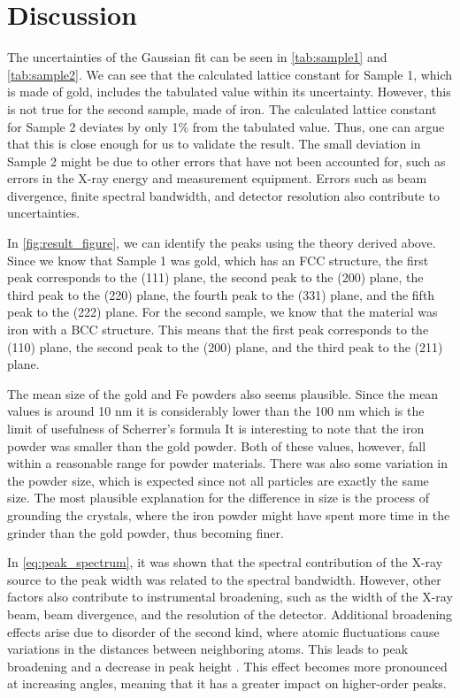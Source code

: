 \section{Discussion}
The uncertainties of the Gaussian fit can be seen in \autoref{tab:sample1} and \autoref{tab:sample2}. We can see that the calculated lattice constant for Sample 1, which is made of gold, includes the tabulated value within its uncertainty. However, this is not true for the second sample, made of iron. The calculated lattice constant for Sample 2 deviates by only 1\% from the tabulated value. Thus, one can argue that this is close enough for us to validate the result. The small deviation in Sample 2 might be due to other errors that have not been accounted for, such as errors in the X-ray energy and measurement equipment. Errors such as beam divergence, finite spectral bandwidth, and detector resolution also contribute to uncertainties.


In \autoref{fig:result_figure}, we can identify the peaks using the theory derived above. Since we know that Sample 1 was gold, which has an FCC structure, the first peak corresponds to the (111) plane, the second peak to the (200) plane, the third peak to the (220) plane, the fourth peak to the (331) plane, and the fifth peak to the (222) plane. For the second sample, we know that the material was iron with a BCC structure. This means that the first peak corresponds to the (110) plane, the second peak to the (200) plane, and the third peak to the (211) plane.

The mean size of the gold and Fe powders also seems plausible. Since the mean values is around 10 nm it is considerably lower than the 100 nm which is the limit of usefulness of Scherrer's formula It is interesting to note that the iron powder was smaller than the gold powder. Both of these values, however, fall within a reasonable range for powder materials. There was also some variation in the powder size, which is expected since not all particles are exactly the same size. The most plausible explanation for the difference in size is the process of grounding the crystals, where the iron powder might have spent more time in the grinder than the gold powder, thus becoming finer.

In \autoref{eq:peak_spectrum}, it was shown that the spectral contribution of the X-ray source to the peak width was related to the spectral bandwidth. However, other factors also contribute to instrumental broadening, such as the width of the X-ray beam, beam divergence, and the resolution of the detector. Additional broadening effects arise due to disorder of the second kind, where atomic fluctuations cause variations in the distances between neighboring atoms. This leads to peak broadening and a decrease in peak height \cite{guinier1963xray}. This effect becomes more pronounced at increasing angles, meaning that it has a greater impact on higher-order peaks.
